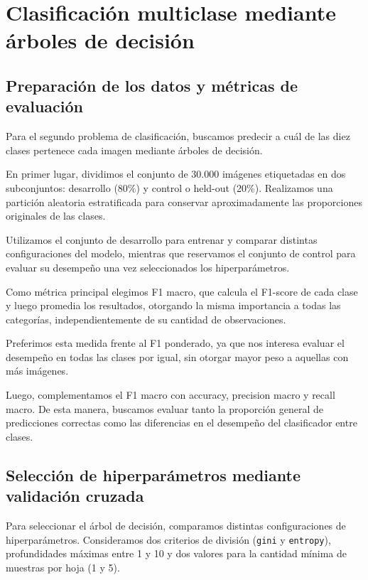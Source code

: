 \documentclass[11pt,a4paper]{article}
\begin{document}
\newpage

\section{Clasificación multiclase mediante árboles de decisión}

\subsection{Preparación de los datos y métricas de evaluación}

Para el segundo problema de clasificación, buscamos
predecir a cuál de las diez clases pertenece cada
imagen mediante árboles de decisión.

En primer lugar, dividimos el conjunto de 30.000
imágenes etiquetadas en dos subconjuntos:
desarrollo (80\%) y control o held-out (20\%).
Realizamos una partición aleatoria estratificada
para conservar aproximadamente las proporciones
originales de las clases.

Utilizamos el conjunto de desarrollo para entrenar
y comparar distintas configuraciones del modelo,
mientras que reservamos el conjunto de control
para evaluar su desempeño una vez seleccionados
los hiperparámetros.

Como métrica principal elegimos F1 macro, que
calcula el F1-score de cada clase y luego
promedia los resultados, otorgando la misma
importancia a todas las categorías,
independientemente de su cantidad de observaciones.

Preferimos esta medida frente al F1 ponderado,
ya que nos interesa evaluar el desempeño en
todas las clases por igual, sin otorgar mayor
peso a aquellas con más imágenes.

Luego, complementamos el F1 macro con accuracy,
precision macro y recall macro. De esta manera,
buscamos evaluar tanto la proporción general
de predicciones correctas como las diferencias
en el desempeño del clasificador entre clases.


\subsection{Selección de hiperparámetros mediante validación cruzada}

Para seleccionar el árbol de decisión, comparamos
distintas configuraciones de hiperparámetros.
Consideramos dos criterios de división
(\texttt{gini} y \texttt{entropy}), profundidades
máximas entre 1 y 10 y dos valores para la
cantidad mínima de muestras por hoja (1 y 5).
\end{document}
